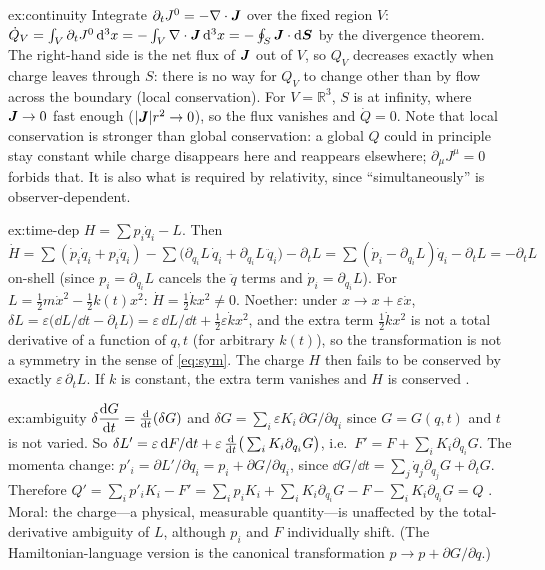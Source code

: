 \documentclass[11pt]{article}
\newcommand{\eps}{\varepsilon}
\begin{document}
\begin{solution}{ex:continuity}
Integrate $\partial_tJ^0=-\nabla\cdot\bm{J}$ over the fixed region $V$: $\dot Q_V=\int_V\partial_tJ^0\,\mathrm{d}^3x=-\int_V\nabla\cdot\bm{J}\,\mathrm{d}^3x=-\oint_S\bm{J}\cdot\mathrm{d}\bm{S}$ by the divergence theorem. The right-hand side is the net flux of $\bm{J}$ out of $V$, so $Q_V$ decreases exactly when charge leaves through $S$: there is no way for $Q_V$ to change other than by flow across the boundary (local conservation). For $V=\mathbb R^3$, $S$ is at infinity, where $\bm{J}\to0$ fast enough ($|\bm{J}|r^2\to0$), so the flux vanishes and $\dot Q=0$. Note that local conservation is stronger than global conservation: a global $Q$ could in principle stay constant while charge disappears here and reappears elsewhere; $\partial_\mu J^\mu=0$ forbids that. It is also what is required by relativity, since ``simultaneously'' is observer-dependent.
\end{solution}

\begin{solution}{ex:time-dep}
$H=\sum p_i\dot q_i-L$. Then $\dot H=\sum(\dot p_i\dot q_i+p_i\ddot q_i)-\sum\big(\partial_{q_i}L\,\dot q_i+\partial_{\dot q_i}L\,\ddot q_i\big)-\partial_tL=\sum(\dot p_i-\partial_{q_i}L)\dot q_i-\partial_tL=-\partial_tL$ on-shell (since $p_i=\partial_{\dot q_i}L$ cancels the $\ddot q$ terms and $\dot p_i=\partial_{q_i}L$). For $L=\tfrac12m\dot x^2-\tfrac12k(t)x^2$: $\dot H=\tfrac12\dot kx^2\ne0$. Noether: under $x\to x+\eps\dot x$, $\delta L=\eps\big(\dd L/\dd t-\partial_tL\big)=\eps\,\dd L/\dd t+\tfrac12\eps\dot kx^2$, and the extra term $\tfrac12\dot kx^2$ is not a total derivative of a function of $q,t$ (for arbitrary $k(t)$), so the transformation is not a symmetry in the sense of \eqref{eq:sym}. The charge $H$ then fails to be conserved by exactly $\eps\,\partial_tL$. If $k$ is constant, the extra term vanishes and $H$ is conserved \checkmark.
\end{solution}

\begin{solution}{ex:ambiguity}
$\delta\dfrac{\mathrm{d} G}{\mathrm{d} t}=\frac{\mathrm{d} }{\mathrm{d} t}(\delta G)$ and $\delta G=\sum_i\eps K_i\,\partial G/\partial q_i$ since $G=G(q,t)$ and $t$ is not varied. So $\delta L'=\eps\,\dd F/\dd t+\eps\,\diff{}{t}\big(\sum_iK_i\partial_{q_i}G\big)$, i.e.\ $F'=F+\sum_iK_i\partial_{q_i}G$. The momenta change: $p'_i=\partial L'/\partial\dot q_i=p_i+\partial G/\partial q_i$, since $\dd G/\dd t=\sum_j\dot q_j\partial_{q_j}G+\partial_tG$. Therefore $Q'=\sum_ip'_iK_i-F'=\sum_ip_iK_i+\sum_iK_i\partial_{q_i}G-F-\sum_iK_i\partial_{q_i}G=Q$ \checkmark. Moral: the charge---a physical, measurable quantity---is unaffected by the total-derivative ambiguity of $L$, although $p_i$ and $F$ individually shift. (The Hamiltonian-language version is the canonical transformation $p\to p+\partial G/\partial q$.)
\end{solution}
\end{document}
